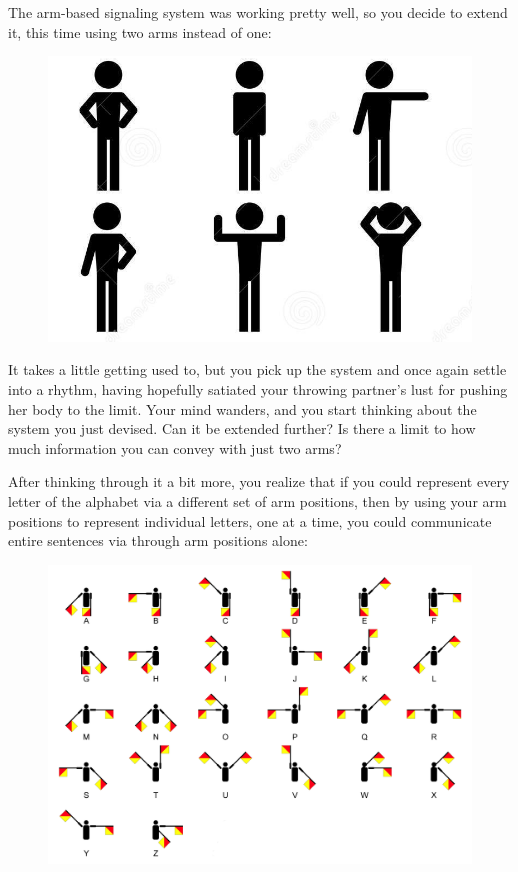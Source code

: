 \documentclass[UTF8]{book}
\begin{document}
\begin{CJK}{UTF8}{gbsn}
The arm-based signaling system was working pretty well, so you decide to extend it, this time using two arms instead of one:

\begin{figure}[H]
\centering
\includegraphics{stick-figure-six-positions-simplified}
\end{figure}

It takes a little getting used to, but you pick up the system and once again settle into a rhythm, having hopefully satiated your throwing partner's lust for pushing her body to the limit. Your mind wanders, and you start thinking about the system you just devised. Can it be extended further? Is there a limit to how much information you can convey with just two arms?

After thinking through it a bit more, you realize that if you could represent every letter of the alphabet via a different set of arm positions, then by using your arm positions to represent individual letters, one at a time, you could communicate entire sentences via through arm positions alone:

\begin{figure}[H]
\centering
\includegraphics[width=0.9\linewidth]{semaphoreflags3}
\end{figure}


\end{CJK}
\end{document}
